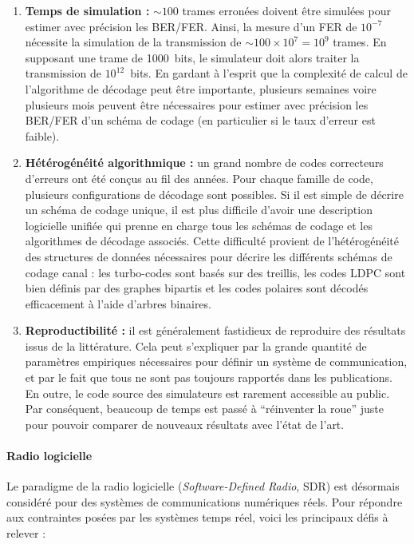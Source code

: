 \begin{enumerate}
  \item \textbf{Temps de simulation :}
    $\sim 100$ trames erronées doivent être simulées pour estimer avec précision
    les BER/FER. Ainsi, la mesure d'un FER de $10^{-7}$ nécessite la simulation
    de la transmission de $\sim100\times 10^7=10^9$ trames. En supposant une
    trame de 1000~bits, le simulateur doit alors traiter la transmission de
    $10^{12}$~bits. En gardant à l'esprit que la complexité de calcul de
    l'algorithme de décodage peut être importante, plusieurs semaines voire
    plusieurs mois peuvent être nécessaires pour estimer avec précision les
    BER/FER d'un schéma de codage (en particulier si le taux d'erreur est
    faible).

  \item \textbf{Hétérogénéité algorithmique :}
    un grand nombre de codes correcteurs d'erreurs ont été conçus au fil des
    années. Pour chaque famille de code, plusieurs configurations de décodage
    sont possibles. Si il est simple de décrire un schéma de codage unique, il
    est  plus difficile d'avoir une description logicielle unifiée qui prenne en
    charge tous les schémas de codage et les algorithmes de décodage associés.
    Cette difficulté provient de l'hétérogénéité des structures de données
    nécessaires pour décrire les différents schémas de codage canal : les
    turbo-codes sont basés sur des treillis, les codes LDPC sont bien définis
    par des graphes bipartis et les codes polaires sont décodés efficacement à
    l'aide d'arbres binaires.

  \item \textbf{Reproductibilité :}
    il est généralement fastidieux de reproduire des résultats issus de la
    littérature. Cela peut s'expliquer par la grande quantité de paramètres
    empiriques nécessaires pour définir un système de communication, et par le
    fait que tous ne sont pas toujours rapportés dans les publications. En
    outre, le code source des simulateurs est rarement accessible au public.
    Par conséquent, beaucoup de temps est passé à ``réinventer la roue'' juste
    pour pouvoir comparer de nouveaux résultats avec l'état de l'art.
\end{enumerate}

\paragraph{Radio logicielle}

Le paradigme de la radio logicielle (\emph{Software-Defined Radio}, SDR) est
désormais considéré pour des systèmes de communications numériques réels. Pour
répondre aux contraintes posées par les systèmes temps réel, voici les
principaux défis à relever :

